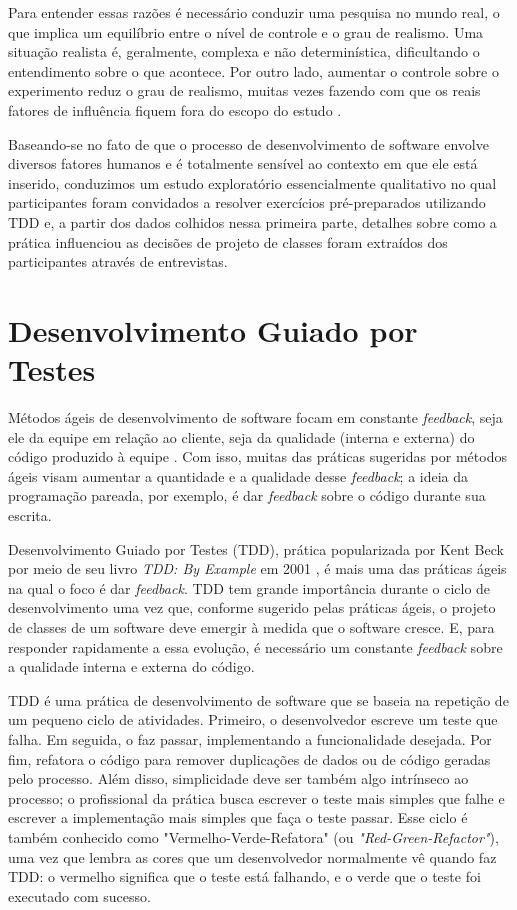 \documentclass[conference]{IEEEtran}
\begin{document}
Para entender essas razões é necessário
conduzir uma pesquisa no mundo real, o que  
implica um equilíbrio entre o nível de controle
e o grau de realismo. Uma situação realista é, geralmente, complexa e 
não determinística, dificultando o entendimento sobre o que acontece. Por outro
lado, aumentar o controle sobre o experimento reduz o grau de realismo, muitas
vezes fazendo com que os reais fatores de influência fiquem fora do escopo do 
estudo \cite{guidelines-case-study}.

Baseando-se no fato de que o processo de desenvolvimento de software envolve 
diversos fatores humanos e é totalmente sensível ao contexto em que ele está 
inserido, 
conduzimos um estudo exploratório essencialmente qualitativo 
no qual participantes foram convidados a resolver exercícios 
pré-preparados utilizando TDD e, a partir 
dos dados colhidos nessa primeira parte, detalhes sobre como a prática influenciou as 
decisões de projeto de classes foram extraídos dos participantes através de 
entrevistas.


\section{Desenvolvimento Guiado por Testes}

Métodos ágeis de desenvolvimento de software focam em constante
\textit{feedback}, seja ele da equipe em relação ao cliente, seja da
qualidade (interna e externa) do código produzido à equipe \cite{AgileManifesto}.
Com isso, muitas das práticas sugeridas por métodos ágeis visam aumentar a 
quantidade e a qualidade desse \textit{feedback}; a ideia da programação pareada, por
exemplo, é dar \textit{feedback} sobre o código durante sua escrita.

Desenvolvimento Guiado por Testes (TDD), prática popularizada por Kent Beck por meio de seu livro
\textit{TDD: By Example} em 2001 \cite{TDDByExample}, é mais uma das práticas
ágeis na qual o foco é dar \textit{feedback}. TDD tem grande importância durante o ciclo
de desenvolvimento uma vez que, conforme sugerido pelas práticas ágeis, o projeto de classes de um
software deve emergir à medida que o software cresce. E, para responder
rapidamente a essa evolução, é necessário um constante \textit{feedback} sobre a
qualidade interna e externa do código.

TDD é uma prática de desenvolvimento de software que se baseia na repetição de
um pequeno ciclo de atividades. Primeiro, o desenvolvedor escreve um
teste que falha. Em seguida, o faz passar, implementando a
funcionalidade desejada. Por fim, refatora o código para remover
duplicações de dados ou de código geradas pelo processo.
Além disso, simplicidade deve ser também algo intrínseco ao processo; o profissional da prática
busca escrever o teste mais simples que falhe e escrever a implementação mais simples
que faça o teste passar.
Esse ciclo
é também conhecido como 
"Vermelho-Verde-Refatora" (ou \textit{"Red-Green-Refactor"}), uma vez que lembra as cores que um 
desenvolvedor normalmente vê quando faz TDD: o vermelho significa que
o teste está falhando, e o verde que o teste foi executado com sucesso.
\end{document}
